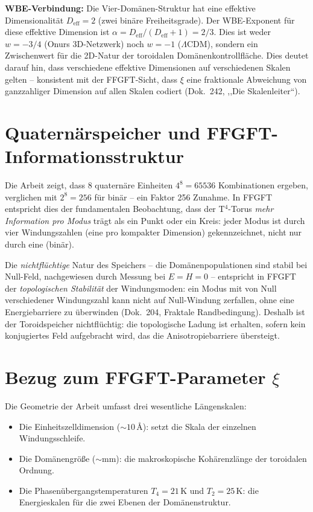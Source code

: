 \noindent\textbf{WBE-Verbindung:} Die Vier-Domänen-Struktur hat eine effektive
Dimensionalität $D_{\mathrm{eff}} = 2$ (zwei binäre Freiheitsgrade). Der
WBE-Exponent für diese effektive Dimension ist
$\alpha = D_{\mathrm{eff}}/(D_{\mathrm{eff}}+1) = 2/3$. Dies ist weder
$w=-3/4$ (Onurs 3D-Netzwerk) noch $w=-1$ ($\Lambda$CDM), sondern ein
Zwischenwert für die 2D-Natur der toroidalen Domänenkontrollfläche. Dies
deutet darauf hin, dass verschiedene effektive Dimensionen auf verschiedenen
Skalen gelten -- konsistent mit der FFGFT-Sicht, dass $\xi$ eine
fraktionale Abweichung von ganzzahliger Dimension auf allen Skalen codiert
(Dok.~242, ,,Die Skalenleiter``).

\section{Quaternärspeicher und FFGFT-Informationsstruktur}

Die Arbeit zeigt, dass 8 quaternäre Einheiten $4^8 = 65536$ Kombinationen
ergeben, verglichen mit $2^8 = 256$ für binär -- ein Faktor 256 Zunahme.
In FFGFT entspricht dies der fundamentalen Beobachtung, dass der T$^4$-Torus
\emph{mehr Information pro Modus} trägt als ein Punkt oder ein Kreis: jeder
Modus ist durch vier Windungszahlen (eine pro kompakter Dimension) gekennzeichnet,
nicht nur durch eine (binär).

Die \emph{nichtflüchtige} Natur des Speichers -- die Domänenpopulationen sind
stabil bei Null-Feld, nachgewiesen durch Messung bei $E=H=0$ -- entspricht in
FFGFT der \emph{topologischen Stabilität} der Windungsmoden: ein Modus mit
von Null verschiedener Windungszahl kann nicht auf Null-Windung zerfallen,
ohne eine Energiebarriere zu überwinden (Dok.~204, Fraktale Randbedingung).
Deshalb ist der Toroidspeicher nichtflüchtig: die topologische Ladung ist
erhalten, sofern kein konjugiertes Feld aufgebracht wird, das die
Anisotropiebarriere übersteigt.

\section{Bezug zum FFGFT-Parameter $\xi$}

Die Geometrie der Arbeit umfasst drei wesentliche Längenskalen:
\begin{itemize}
  \item Die Einheitszelldimension ($\sim 10$\,\AA): setzt die Skala der
        einzelnen Windungsschleife.
  \item Die Domänengröße ($\sim$mm): die makroskopische Kohärenzlänge der
        toroidalen Ordnung.
  \item Die Phasenübergangstemperaturen $T_4=21$\,K und $T_2=25$\,K:
        die Energieskalen für die zwei Ebenen der Domänenstruktur.
\end{itemize}

